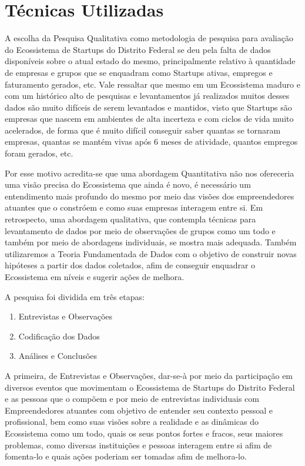 \section{Técnicas Utilizadas}
\label{section:tecnicas_utilizadas}

A escolha da Pesquisa Qualitativa como metodologia de pesquisa para avaliação do Ecossistema de Startups do Distrito Federal se deu pela falta de dados disponíveis sobre o atual estado do mesmo,
principalmente relativo à quantidade de empresas e grupos que se enquadram como Startups ativas, empregos e faturamento gerados, etc. Vale ressaltar que mesmo em um Ecossistema maduro e com um histórico
alto de pesquisas e levantamentos já realizados muitos desses dados são muito difíceis de serem levantados e mantidos, visto que Startups são empresas que nascem em ambientes de alta incerteza e
com ciclos de vida muito acelerados, de forma que é muito difícil conseguir saber quantas se tornaram empresas, quantas se mantém vivas após 6 meses de atividade, quantos empregos foram gerados, etc.

Por esse motivo acredita-se que uma abordagem Quantitativa não nos ofereceria uma visão precisa do Ecossistema que ainda é novo, é necessário um entendimento mais profundo do mesmo por meio das
visões dos empreendedores atuantes que o constróem e como suas empresas interagem entre si. Em retrospecto, uma abordagem qualitativa, que contempla técnicas para levantamento de dados por meio
de observações de grupos como um todo e também por meio de abordagens individuais, se mostra mais adequada. Também utilizaremos a Teoria Fundamentada de Dados com o objetivo de construir novas hipóteses a partir dos dados coletados, afim de conseguir enquadrar o Ecossistema em níveis e sugerir ações
de melhora.

A pesquisa foi dividida em três etapas:

\begin{enumerate}
  \item Entrevistas e Observações
  \item Codificação dos Dados
  \item Análises e Conclusões
\end{enumerate}

A primeira, de Entrevistas e Observações, dar-se-à por meio da participação em diversos eventos que movimentam o Ecossistema de Startups do Distrito Federal e as pessoas que o compõem e por meio
de entrevistas individuais com Empreendedores atuantes com objetivo de entender seu contexto pessoal e profissional, bem como suas visões sobre a realidade e as dinâmicas do Ecossistema como um todo,
quais os seus pontos fortes e fracos, seus maiores problemas, como diversas instituições e pessoas interagem entre si afim de fomenta-lo e quais ações poderiam ser tomadas afim de melhora-lo.

